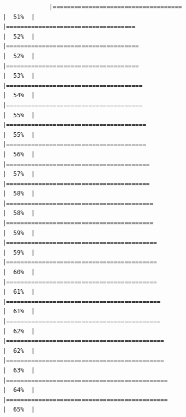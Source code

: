 \documentclass[
]{article}
\begin{document}
\begin{verbatim}
             |====================================                                  |  51%  |                                                                              |====================================                                  |  52%  |                                                                              |=====================================                                 |  52%  |                                                                              |=====================================                                 |  53%  |                                                                              |======================================                                |  54%  |                                                                              |======================================                                |  55%  |                                                                              |=======================================                               |  55%  |                                                                              |=======================================                               |  56%  |                                                                              |========================================                              |  57%  |                                                                              |========================================                              |  58%  |                                                                              |=========================================                             |  58%  |                                                                              |=========================================                             |  59%  |                                                                              |==========================================                            |  59%  |                                                                              |==========================================                            |  60%  |                                                                              |==========================================                            |  61%  |                                                                              |===========================================                           |  61%  |                                                                              |===========================================                           |  62%  |                                                                              |============================================                          |  62%  |                                                                              |============================================                          |  63%  |                                                                              |=============================================                         |  64%  |                                                                              |=============================================                         |  65%  |                                                                  
\end{verbatim}
\end{document}
